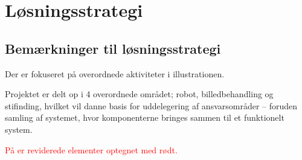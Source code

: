 \section{Løsningsstrategi}
\subsection{Bemærkninger til løsningsstrategi}
Der er fokuseret på overordnede aktiviteter i illustrationen.

Projektet er delt op i 4 overordnede området; robot, billedbehandling og stifinding, hvilket vil danne basis for uddelegering af ansvarsområder -- foruden samling af systemet, hvor komponenterne bringes sammen til et funktionelt system.

\textcolor{red}{På  er reviderede elementer optegnet med rødt.}